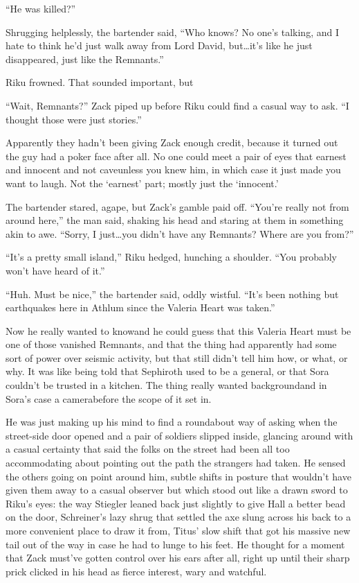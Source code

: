 ``He was killed?''

Shrugging helplessly, the bartender said, ``Who knows? No one's talking, and I hate to think he'd just walk away from Lord David, but\ldots it's like he just disappeared, just like the Remnants.''

Riku frowned. That sounded important, but\textemdash 

``Wait, Remnants?'' Zack piped up before Riku could find a casual way to ask. ``I thought those were just stories.''

Apparently they hadn't been giving Zack enough credit, because it turned out the guy had a poker face after all. No one could meet a pair of eyes that earnest and innocent and not cave\textemdash unless you knew him, in which case it just made you want to laugh. Not the `earnest' part; mostly just the `innocent.'

The bartender stared, agape, but Zack's gamble paid off. ``You're really not from around here,'' the man said, shaking his head and staring at them in something akin to awe. ``Sorry, I just\ldots you didn't have any Remnants? Where are you from?''

``It's a pretty small island,'' Riku hedged, hunching a shoulder. ``You probably won't have heard of it.''

``Huh. Must be nice,'' the bartender said, oddly wistful. ``It's been nothing but earthquakes here in Athlum since the Valeria Heart was taken.''

Now he really wanted to know\textemdash and he could guess that this Valeria Heart must be one of those vanished Remnants, and that the thing had apparently had some sort of power over seismic activity, but that still didn't tell him how, or what, or why. It was like being told that Sephiroth used to be a general, or that Sora couldn't be trusted in a kitchen. The thing really wanted background\textemdash and in Sora's case a camera\textemdash before the scope of it set in.

He was just making up his mind to find a roundabout way of asking when the street-side door opened and a pair of soldiers slipped inside, glancing around with a casual certainty that said the folks on the street had been all too accommodating about pointing out the path the strangers had taken. He sensed the others going on point around him, subtle shifts in posture that wouldn't have given them away to a casual observer but which stood out like a drawn sword to Riku's eyes: the way Stiegler leaned back just slightly to give Hall a better bead on the door, Schreiner's lazy shrug that settled the axe slung across his back to a more convenient place to draw it from, Titus' slow shift that got his massive new tail out of the way in case he had to lunge to his feet. He thought for a moment that Zack must've gotten control over his ears after all, right up until their sharp prick clicked in his head as fierce interest, wary and watchful.

